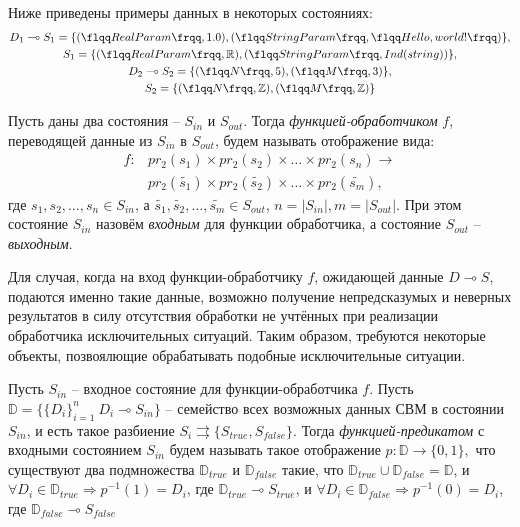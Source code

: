 Ниже приведены примеры данных в некоторых состояниях:
\begin{gather*}
    D_1 \multimap S_1 = \{(\flqq RealParam \frqq, 1.0), (\flqq StringParam \frqq, \flqq Hello, world! \frqq)\}, \\
    S_1=\{(\flqq RealParam \frqq, \mathbb{R}),(\flqq StringParam \frqq, Ind(string))\},                         \\
    D_2 \multimap S_2 = \{(\flqq N \frqq, 5), (\flqq M \frqq, 3)\},                                             \\
    S_2 = \{(\flqq N \frqq, \mathbb{Z}), (\flqq M \frqq, \mathbb{Z})\}
\end{gather*}

\begin{definition}
    Пусть даны два состояния -- $S_{in}$ и $S_{out}$. Тогда \emph{функцией-обработчиком} $f$, переводящей данные из $S_{in}$ в $S_{out}$, будем называть отображение вида:
    \begin{align*}
        f: & pr_2(s_1) \times pr_2(s_2) \times \dots \times pr_2(s_n) \rightarrow              \\
           & pr_2(\tilde{s_1}) \times pr_2(\tilde{s_2}) \times \dots \times pr_2(\tilde{s_m}),
    \end{align*}
    где $s_1, s_2, \dots, s_n \in S_{in}$, а $\tilde{s_1}, \tilde{s_2}, \dots, \tilde{s_m} \in S_{out}$, $n = |S_{in}|, m = |S_{out}|$. При этом состояние $S_{in}$ назовём \emph{входным} для функции обработчика, а состояние $S_{out}$ -- \emph{выходным}.
\end{definition}


Для случая, когда на вход функции-обработчику $f$, ожидающей данные $D \multimap S$, подаются именно такие данные, возможно получение непредсказумых и неверных результатов в силу отсутствия обработки не учтённых при реализации обработчика исключительных ситуаций. Таким образом, требуются некоторые объекты, позвоялющие обрабатывать подобные исключительные ситуации.

\begin{definition}
    Пусть $S_{in}$ -- входное состояние для функции-обработчика $f$. Пусть $\mathbb{D}=\{\{D_i\}^n_{i=1}\:D_i \multimap S_{in}\}$ -- семейство всех возможных данных СВМ в состоянии $S_{in}$, и есть такое разбиение $S_i\rightrightarrows \{S_{true},S_{false}\}$. Тогда \emph{функцией-предикатом} с входными состоянием $S_{in}$ будем называть такое отображение $p:\mathbb{D}\to \{0,1\},$ что существуют два подмножества $\mathbb{D}_{true}$ и $\mathbb{D}_{false}$ такие, что $\mathbb{D}_{true} \cup \mathbb{D}_{false} = \mathbb{D}$, и $\forall D_i \in \mathbb{D}_{true} \Rightarrow p^{-1}(1) = D_i$, где $\mathbb{D}_{true} \multimap S_{true}$, и $\forall D_i \in \mathbb{D}_{false} \Rightarrow p^{-1}(0) = D_i$, где $\mathbb{D}_{false} \multimap S_{false}$
\end{definition}

